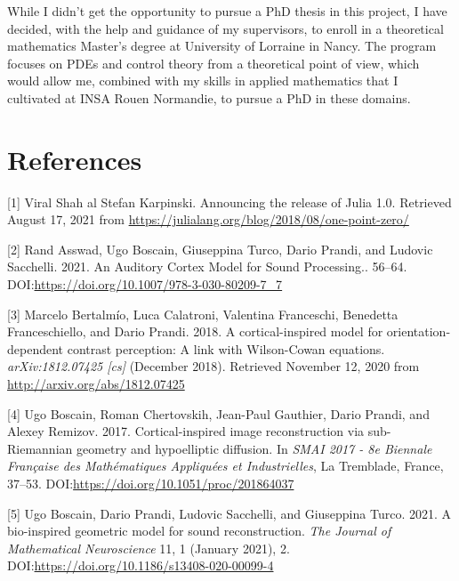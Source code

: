 \documentclass[american,]{article}
\theoremstyle{definition}
\theoremstyle{definition}
\theoremstyle{definition}
\theoremstyle{remark}
\begin{document}
While I didn't get the opportunity to pursue a PhD thesis in this project,
I have decided, with the help and guidance of my supervisors, to enroll in a
theoretical mathematics Master's degree at University of Lorraine in Nancy.
The program focuses on PDEs and control theory from a theoretical point of view,
which would allow me, combined with my skills in applied mathematics that
I cultivated at INSA Rouen Normandie, to pursue a PhD in these domains.

\pagebreak

\hypertarget{references}{%
\section*{References}\label{references}}

\hypertarget{refs}{}
\leavevmode\hypertarget{ref-julia2018}{}%
{[}1{]} Viral Shah al Stefan Karpinski. Announcing the release of Julia 1.0. Retrieved August 17, 2021 from \url{https://julialang.org/blog/2018/08/one-point-zero/}

\leavevmode\hypertarget{ref-asswad2021}{}%
{[}2{]} Rand Asswad, Ugo Boscain, Giuseppina Turco, Dario Prandi, and Ludovic Sacchelli. 2021. An Auditory Cortex Model for Sound Processing.. 56--64. DOI:\url{https://doi.org/10.1007/978-3-030-80209-7_7}

\leavevmode\hypertarget{ref-bertalmio2018}{}%
{[}3{]} Marcelo Bertalmío, Luca Calatroni, Valentina Franceschi, Benedetta Franceschiello, and Dario Prandi. 2018. A cortical-inspired model for orientation-dependent contrast perception: A link with Wilson-Cowan equations. \emph{arXiv:1812.07425 {[}cs{]}} (December 2018). Retrieved November 12, 2020 from \url{http://arxiv.org/abs/1812.07425}

\leavevmode\hypertarget{ref-boscain2017}{}%
{[}4{]} Ugo Boscain, Roman Chertovskih, Jean-Paul Gauthier, Dario Prandi, and Alexey Remizov. 2017. Cortical-inspired image reconstruction via sub-Riemannian geometry and hypoelliptic diffusion. In \emph{SMAI 2017 - 8e Biennale Française des Mathématiques Appliquées et Industrielles}, La Tremblade, France, 37--53. DOI:\url{https://doi.org/10.1051/proc/201864037}

\leavevmode\hypertarget{ref-boscain2021}{}%
{[}5{]} Ugo Boscain, Dario Prandi, Ludovic Sacchelli, and Giuseppina Turco. 2021. A bio-inspired geometric model for sound reconstruction. \emph{The Journal of Mathematical Neuroscience} 11, 1 (January 2021), 2. DOI:\url{https://doi.org/10.1186/s13408-020-00099-4}
\end{document}
